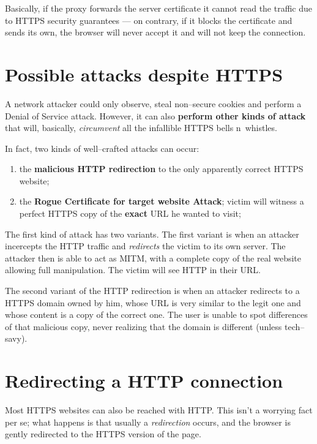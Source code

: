 \documentclass[10pt]{extreport}
\begin{document}
Basically, if the proxy forwards the server certificate it cannot read the
traffic due to HTTPS security guarantees --- on contrary, if it blocks the
certificate and sends its own, the browser will never accept it and will not
keep the connection.

\section{Possible attacks despite HTTPS}

A network attacker could only observe, steal non--secure cookies and perform a
Denial of Service attack. However, it can also \textbf{perform other kinds of
attack} that will, basically, \emph{circumvent} all the infallible HTTPS
bells n\textquotesingle\  whistles.

In fact, two kinds of well--crafted attacks can occur:
\begin{enumerate}
    \item the \textbf{malicious HTTP redirection} to the only apparently correct
        HTTPS website;
    \item the \textbf{Rogue Certificate for target website Attack}; victim will
        witness a perfect HTTPS copy of the \textbf{exact} URL he wanted to
        visit;
\end{enumerate}

The first kind of attack has two variants. The first variant is when an
attacker incercepts the HTTP traffic and \emph{redirects} the victim to its own
server. The attacker then is able to act as MITM, with a complete copy of the
real website allowing full manipulation. The victim will see HTTP in their URL.

The second variant of the HTTP redirection is when an attacker redirects to a
HTTPS domain owned by him, whose URL is very similar to the legit one and whose
content is a copy of the correct one. The user is unable to spot differences of
that malicious copy, never realizing that the domain is different (unless
tech--savy).

\section{Redirecting a HTTP connection}

Most HTTPS websites can also be reached with HTTP. This isn't a worrying fact
per se; what happens is that usually a \emph{redirection} occurs, and the
browser is gently redirected to the HTTPS version of the page.
\end{document}
